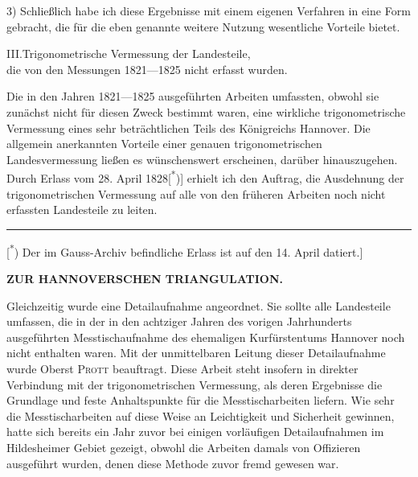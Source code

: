 \par\noindent\hspace*{\parindent}3) Schließlich habe ich diese Ergebnisse mit einem eigenen Verfahren in eine Form gebracht, die für die eben genannte weitere Nutzung wesentliche Vorteile bietet.

\begin{center}
III.\quad Trigonometrische Vermessung der Landesteile,\\
die von den Messungen 1821---1825 nicht erfasst wurden.
\end{center}

\par\noindent\hspace*{\parindent}Die in den Jahren 1821---1825 ausgeführten Arbeiten umfassten, obwohl sie zunächst nicht für diesen Zweck bestimmt waren, eine wirkliche trigonometrische Vermessung eines sehr beträchtlichen Teils des Königreichs Hannover. Die allgemein anerkannten Vorteile einer genauen trigonometrischen Landesvermessung ließen es wünschenswert erscheinen, darüber hinauszugehen. Durch Erlass vom 28. April 1828[\textsuperscript{*})] erhielt ich den Auftrag, die Ausdehnung der trigonometrischen Vermessung auf alle von den früheren Arbeiten noch nicht erfassten Landesteile zu leiten.

\par\smallskip\noindent\rule{.24\linewidth}{.4pt}\par\smallskip
{\footnotesize\noindent\hspace*{\parindent}[\textsuperscript{*}) Der im Gauss-Archiv befindliche Erlass ist auf den 14. April datiert.]\par}

\par\clearpage
\noindent\null\hfill{\small\textbf{ZUR HANNOVERSCHEN TRIANGULATION.}}\hfill{}\par\medskip

\par\noindent\hspace*{\parindent}Gleichzeitig wurde eine Detailaufnahme angeordnet. Sie sollte alle Landesteile umfassen, die in der in den achtziger Jahren des vorigen Jahrhunderts ausgeführten Messtischaufnahme des ehemaligen Kurfürstentums Hannover noch nicht enthalten waren. Mit der unmittelbaren Leitung dieser Detailaufnahme wurde Oberst \textsc{Prott} beauftragt. Diese Arbeit steht insofern in direkter Verbindung mit der trigonometrischen Vermessung, als deren Ergebnisse die Grundlage und feste Anhaltspunkte für die Messtischarbeiten liefern. Wie sehr die Messtischarbeiten auf diese Weise an Leichtigkeit und Sicherheit gewinnen, hatte sich bereits ein Jahr zuvor bei einigen vorläufigen Detailaufnahmen im Hildesheimer Gebiet gezeigt, obwohl die Arbeiten damals von Offizieren ausgeführt wurden, denen diese Methode zuvor fremd gewesen war.


